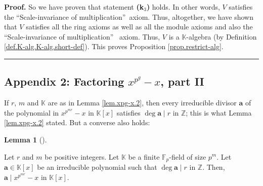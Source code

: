 \documentclass[numbers=enddot,12pt,final,onecolumn,notitlepage]{scrartcl}%
\theoremstyle{definition}
\newtheorem{lem}[theo]{Lemma}
\newenvironment{lemma}[1][]
{\begin{lem}[#1]\begin{leftbar}}
{\end{leftbar}\end{lem}}
\newenvironment{fineprint}{\begin{small}}{\end{small}}
\newenvironment{proof}[1][Proof]{\noindent\textbf{#1.} }{\ \rule{0.5em}{0.5em}}
\begin{document}
\begin{fineprint}
\begin{proof}
So we have proven that statement \textbf{(k}$_{3}$\textbf{)} holds. In other
words, $V$ satisfies the \textquotedblleft Scale-invariance of
multiplication\textquotedblright\ axiom. Thus, altogether, we have shown that
$V$ satisfies all the ring axioms as well as all the module axioms and also
the \textquotedblleft Scale-invariance of multiplication\textquotedblright%
\ axiom. Thus, $V$ is a $\mathbb{K}$-algebra (by Definition
\ref{def.K-alg.K-alg.short-def}). This proves Proposition
\ref{prop.restrict-alg}.
\end{proof}
\end{fineprint}

\subsection{Appendix 2: Factoring $x^{p^{g}}-x$, part II}

If $r$, $m$ and $\mathbb{K}$ are as in Lemma \ref{lem.xpg-x.2}, then every
irreducible divisor $\mathbf{a}$ of the polynomial in $x^{p^{mr}}-x$ in
$\mathbb{K}\left[  x\right]  $ satisfies $\deg\mathbf{a}\mid r$ in
$\mathbb{Z}$; this is what Lemma \ref{lem.xpg-x.2} stated. But a converse also holds:

\begin{lemma}
\label{lem.xpg-x.4}Let $r$ and $m$ be positive integers. Let $\mathbb{K}$ be a
finite $\mathbb{F}_{p}$-field of size $p^{m}$. Let $\mathbf{a}\in
\mathbb{K}\left[  x\right]  $ be an irreducible polynomial such that
$\deg\mathbf{a}\mid r$ in $\mathbb{Z}$. Then, $\mathbf{a}\mid x^{p^{mr}}-x$ in
$\mathbb{K}\left[  x\right]  $.
\end{lemma}
\end{document}
